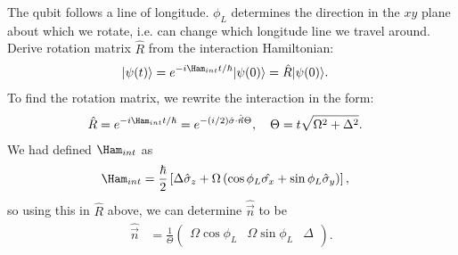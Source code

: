 \documentclass[a4paper, 11pt, normalem]{report}
\begin{document}
The qubit follows a line of longitude.
$\phi_L$ determines the direction in the $xy$ plane about which we rotate, i.e. can change which longitude line we travel around.
Derive rotation matrix $\hat{R}$ from the interaction Hamiltonian:
\begin{align}
    |\psi(t)\rangle &= e^{-i\Ham_{int}t/\hbar}|\psi(0)\rangle = \hat{R}|\psi(0)\rangle.
\end{align}
To find the rotation matrix, we rewrite the interaction in the form:
\begin{align}
    \hat{R} &= e^{-i\Ham_{int}t/\hbar} = e^{-(i/2)\hat{\sigma}\cdot\hat{\vec{n}}\Theta},\quad \Theta = t\sqrt{\Omega^2+\Delta^2}.
\end{align}
We had defined $\Ham_{int}$ as
\begin{align}
    \Ham_{int} &= \frac{\hbar}{2}\left[\Delta\hat{\sigma}_z + \Omega\left(\cos\phi_L\hat{\sigma_x}+\sin\phi_L\hat{\sigma}_y\right)\right],
\end{align}
so using this in $\hat{R}$ above, we can determine $\hat{\vec{n}}$ to be
\begin{align}
    \hat{\vec{n}} &= \frac{1}{\Theta}\begin{pmatrix} \Omega\cos\phi_L & \Omega\sin\phi_L & \Delta\end{pmatrix}.
\end{align}
\end{document}
